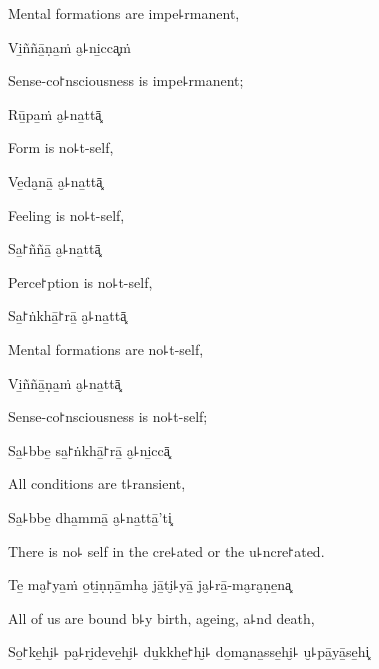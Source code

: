 \begin{english}
  Mental formations are impe꜕rmanent,
\end{english}

Vi̱ññā̱ṇa̱ṁ a̮꜕ni̱cca͓ṁ

\begin{english}
  Sense-co꜓nsciousness is impe꜕rmanent;
\end{english}

Rū̱pa̱ṁ a̮꜕na̱ttā͓

\begin{english}
  Form is no꜕t-self,
\end{english}

Ve̱da̮nā̱ a̮꜕na̱ttā͓

\begin{english}
  Feeling is no꜕t-self,
\end{english}

Sa̱꜓ññā̱ a̮꜕na̱ttā͓

\begin{english}
  Perce꜓ption is no꜕t-self,
\end{english}

Sa̱꜓ṅkhā̱꜓rā̱ a̮꜕na̱ttā͓

\begin{english}
  Mental formations are no꜕t-self,
\end{english}

Vi̱ññā̱ṇa̱ṁ a̮꜕na̱ttā͓

\begin{english}
  Sense-co꜓nsciousness is no꜕t-self;
\end{english}

Sa̱꜕bbe̱ sa̱꜓ṅkhā̱꜓rā̱ a̮꜕ni̱ccā͓

\begin{english}
  All conditions are t꜕ransient,
\end{english}

Sa̱꜕bbe̱ dha̱mmā̱ a̮꜕na̱ttā̱'ti͓

\begin{english}
  There is no꜕ self in the cre꜕ated or the u꜕ncre꜓ated.
\end{english}

Te̱ ma̮꜓ya̱ṁ o̱ti̱ṇṇā̱mha̮ jā̱ti̮꜕yā̱ ja̮꜕rā̱-ma̮ra̮ṇe̱na͓

\begin{english}
  All of us are bound b꜕y birth, ageing, a꜕nd death,
\end{english}

So̱꜓ke̱hi̮꜕ pa̮꜕ri̮de̱ve̱hi̮꜕ du̱kkhe̱꜓hi̮꜕ do̱ma̮na̱sse̱hi̮꜕ u̮꜕pā̱yā̱se̱hi͓

